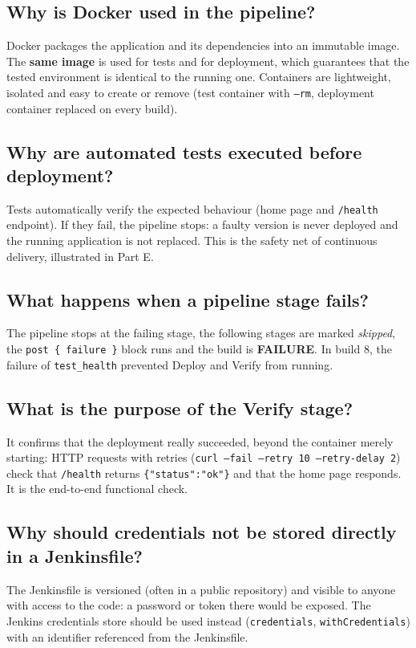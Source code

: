 \documentclass[11pt,a4paper]{article}
\begin{document}
\subsection{Why is Docker used in the pipeline?}
Docker packages the application and its dependencies into an immutable image. The
\textbf{same image} is used for tests and for deployment, which guarantees that the tested
environment is identical to the running one. Containers are lightweight, isolated and easy
to create or remove (test container with \texttt{--rm}, deployment container replaced on
every build).

\subsection{Why are automated tests executed before deployment?}
Tests automatically verify the expected behaviour (home page and \texttt{/health}
endpoint). If they fail, the pipeline stops: a faulty version is never deployed and the
running application is not replaced. This is the safety net of continuous delivery,
illustrated in Part E.

\subsection{What happens when a pipeline stage fails?}
The pipeline stops at the failing stage, the following stages are marked \emph{skipped},
the \texttt{post \{ failure \}} block runs and the build is
\textcolor{failred}{\textbf{FAILURE}}. In build 8, the failure of \texttt{test\_health}
prevented Deploy and Verify from running.

\subsection{What is the purpose of the Verify stage?}
It confirms that the deployment really succeeded, beyond the container merely starting:
HTTP requests with retries (\texttt{curl --fail --retry 10 --retry-delay 2}) check that
\texttt{/health} returns \texttt{\{"status":"ok"\}} and that the home page responds. It is
the end-to-end functional check.

\subsection{Why should credentials not be stored directly in a Jenkinsfile?}
The Jenkinsfile is versioned (often in a public repository) and visible to anyone with
access to the code: a password or token there would be exposed. The Jenkins credentials
store should be used instead (\texttt{credentials}, \texttt{withCredentials}) with an
identifier referenced from the Jenkinsfile.
\end{document}
